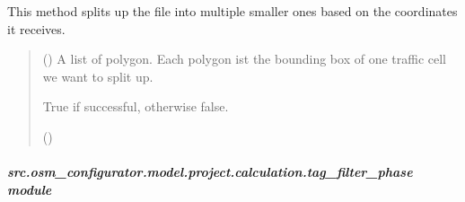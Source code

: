 \documentclass[letterpaper,10pt,english]{sphinxmanual}
\begin{document}
\begin{fulllineitems}
\begin{fulllineitems}
\label{\detokenize{apidoc/src.osm_configurator.model.project.calculation:src.osm_configurator.model.project.calculation.split_up_files.SplitUpFile.split_up_files}}
\pysigstartsignatures
{}
\pysigstopsignatures
\sphinxAtStartPar
This method splits up the file into multiple smaller ones based on the coordinates it receives.
\begin{quote}\begin{description}
\sphinxAtStartPar
{} (\sphinxstyleliteralemphasis{\sphinxupquote{{[}}}\sphinxstyleliteralemphasis{\sphinxupquote{{]}}}) \textendash{} A list of polygon. Each polygon ist the bounding box of one traffic cell we want to split up.

\sphinxAtStartPar
True if successful, otherwise false.

\sphinxAtStartPar
()

\end{description}\end{quote}

\end{fulllineitems}


\end{fulllineitems}



\subparagraph{src.osm\_configurator.model.project.calculation.tag\_filter\_phase module}
\label{\detokenize{apidoc/src.osm_configurator.model.project.calculation:module-src.osm_configurator.model.project.calculation.tag_filter_phase}}\label{\detokenize{apidoc/src.osm_configurator.model.project.calculation:src-osm-configurator-model-project-calculation-tag-filter-phase-module}}
\end{document}
